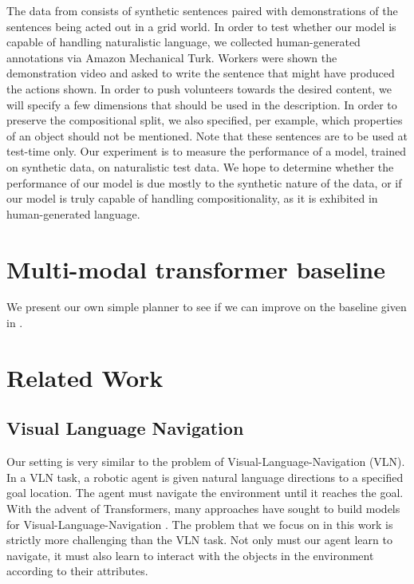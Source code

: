 \documentclass[11pt]{article}
\begin{document}
The data from \citet{ruis2020benchmark} consists of synthetic sentences paired with demonstrations of the sentences being acted out in a grid world.
%
In order to test whether our model is capable of handling naturalistic language, we collected human-generated annotations via Amazon Mechanical Turk.
%
Workers were shown the demonstration video and asked to write the sentence that might have produced the actions shown.
%
In order to push volunteers towards the desired content, we will specify a few dimensions that should be used in the description.
%
In order to preserve the compositional split, we also specified, per example, which properties of an object should not be mentioned.
%
Note that these sentences are to be used at test-time only.
%
Our experiment is to measure the performance of a model, trained on synthetic data, on naturalistic test data.
%
We hope to determine whether the performance of our model is due mostly to the synthetic nature of the data, or if our model is truly capable of handling compositionality, as it is exhibited in human-generated language. 

\section{Multi-modal transformer baseline}
\label{transformer-planner}
We present our own simple planner to see if we can improve on the baseline given in \cite{ruis2020benchmark}.

\section{Related Work}
\subsection{Visual Language Navigation}
Our setting is very similar to the problem of Visual-Language-Navigation (VLN). 
%
In a VLN task, a robotic agent is given natural language directions to a specified goal location. 
%
The agent must navigate the environment until it reaches the goal.
%
With the advent of Transformers, many approaches have sought to build models for Visual-Language-Navigation \citep{magassouba2021crossmap, fang2019scene, Chen2020TopologicalPW}.
%
The problem that we focus on in this work is strictly more challenging than the VLN task. 
%
Not only must our agent learn to navigate, it must also learn to interact with the objects in the environment according to their attributes.
\end{document}
